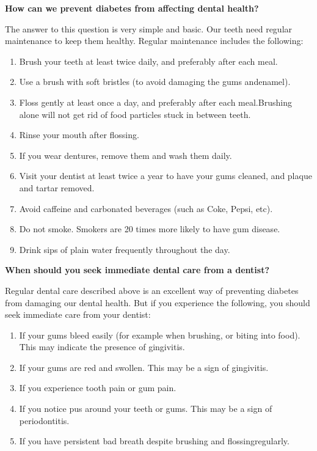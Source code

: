 \noindent\textbf{How can we prevent diabetes from affecting dental health?}

The answer to this question is very simple and basic. Our teeth need regular maintenance to keep them healthy. Regular maintenance includes the following:

\begin{enumerate}[•]
\itemsep=0pt
\item Brush your teeth at least twice daily, and preferably after each meal.
\item Use a brush with soft bristles (to avoid damaging the gums and\break enamel).
\item Floss gently at least once a day, and preferably after each meal.\break Brushing alone will not get rid of food particles stuck in between teeth.
\item Rinse your mouth after flossing.
\item If you wear dentures, remove them and wash them daily.
\item Visit your dentist at least twice a year to have your gums cleaned, and plaque and tartar removed.
\item Avoid caffeine and carbonated beverages (such as Coke, Pepsi, etc).
\item Do not smoke. Smokers are 20 times more likely to have gum disease.
\item Drink sips of plain water frequently throughout the day.
\end{enumerate}

\noindent\textbf{When should you seek immediate dental care from a dentist?}

Regular dental care described above is an excellent way of preve\-nting diabetes from damaging our dental health. But if you experience the following, you should seek immediate care from your dentist:

\begin{enumerate}[•]
\itemsep=0pt
\item If your gums bleed easily (for example when brushing, or biting into food). This may indicate the presence of gingivitis.
\item If your gums are red and swollen. This may be a sign of gingivitis.
\item If you experience tooth pain or gum pain.
\item If you notice pus around your teeth or gums. This may be a sign of periodontitis.
\item If you have persistent bad breath despite brushing and flossing\break regularly.
\end{enumerate}

